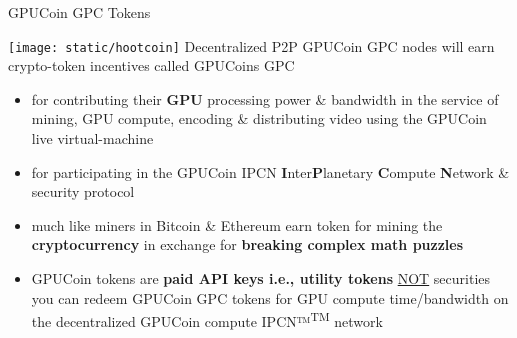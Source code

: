 
\begin{frame}[t]{GPUCoin GPC Tokens }
 
\texttt{[image: static/hootcoin]} Decentralized P2P	 GPUCoin GPC nodes will earn crypto-token incentives called GPUCoins GPC

 \begin{itemize}[<+-| alert@+>]
 \item for contributing their \textbf{GPU} processing power \& bandwidth in the service of mining, GPU compute, encoding \& distributing video using the GPUCoin live virtual-machine 
 \item for participating in the GPUCoin IPCN \textbf{I}nter\textbf{P}lanetary \textbf{C}ompute \textbf{N}etwork \& security protocol
 \item much like miners in Bitcoin \& Ethereum earn token for mining the \textbf{cryptocurrency} in exchange for \textbf{breaking complex math puzzles}
 \item GPUCoin tokens are \textbf{paid API keys i.e., utility tokens} \underline{NOT} securities you can redeem GPUCoin GPC tokens for GPU compute time/bandwidth on the decentralized GPUCoin compute IPCN™\textsuperscript{TM} network
 \end{itemize}
 
\end{frame}
